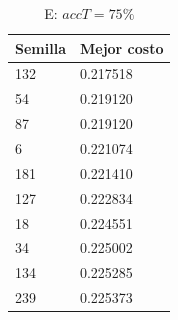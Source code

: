 \documentclass{article}
\begin{document}
\begin{table}[!htb]
    \begin{minipage}{\linewidth}
      \centering
        \caption{E: $accT = 75 \%$}
        \begin{tabular}{l|l}
            Semilla & Mejor costo \\
            \hline
            132     & 0.217518 \\
            \hline
            54      & 0.219120 \\
            \hline
            87      & 0.219120 \\
            \hline
            6       & 0.221074 \\
            \hline
            181     & 0.221410 \\
            \hline
            127     & 0.222834 \\
            \hline
            18      & 0.224551 \\
            \hline
            34      & 0.225002 \\
            \hline
            134     & 0.225285 \\
            \hline
            239     & 0.225373 \\
        \end{tabular}
    \end{minipage} 
  \end{table}
\end{document}
